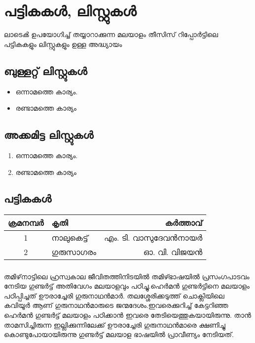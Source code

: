  
\chapter{പട്ടികകൾ, ലിസ്റ്റുകൾ}
ലാടെൿ ഉപയോഗിച്ച് തയ്യാറാക്കുന്ന മലയാളം തീസിസ് റിപ്പോർട്ടിലെ പട്ടികകളും ലിസ്റ്റുകളും ഉള്ള അദ്ധ്യായം

\section{ബുള്ളറ്റ് ലിസ്റ്റുകൾ}

\begin{itemize}
\item ഒന്നാമത്തെ കാര്യം.
\item രണ്ടാമത്തെ കാര്യം
\end{itemize}

\section{അക്കമിട്ട ലിസ്റ്റുകൾ}
\begin{enumerate}
\item ഒന്നാമത്തെ കാര്യം.
\item രണ്ടാമത്തെ കാര്യം
\end{enumerate}


\section{പട്ടികകൾ}

\begin{tabular}{|c|l|r|}
		\hline
		ക്രമനമ്പർ &  കൃതി  & കർത്താവ്  \\ \hline 
		1 & നാലുകെട്ട് & എം. ടി. വാസുദേവൻനായർ \\  \hline
		2 & ഗുരുസാഗരം & ഓ. വി. വിജയൻ \\ \hline
\end{tabular}

\paragraph{}
തമിഴ്‌നാട്ടിലെ ഹ്രസ്വകാല ജീവിതത്തിനിടയിൽ തമിഴ്ഭാഷയിൽ പ്രസംഗപാടവം നേടിയ ഗുണ്ടർട്ട് അതിവേഗം മലയാളവും പഠിച്ചു.ഹെർമൻ ഗുണ്ടർട്ടിനെ മലയാളം പഠിപ്പിച്ചത് ഊരാച്ചേരി ഗുരുനാഥൻമാർ. തലശ്ശേരിക്കടുത്ത് ചൊക്ലിയിലെ കവിയൂർ ആണ് ഗുരുനാഥൻമാരുടെ ജന്മദേശം.ഇവരെക്കുറിച്ച് കേട്ടറിഞ്ഞ ഹെർമൻ ഗുണ്ടർട്ട് മലയാളം പഠിക്കാൻ ഇവരെ തേടിയെത്തുകയായിരുന്നു. താൻ താമസിച്ചിരുന്ന ഇല്ലിക്കുന്നിലേക്ക് ഊരാച്ചേരി ഗുരുനാഥൻമാരെ ക്ഷണിച്ചു കൊണ്ടുപോയായിരുന്നു ഗുണ്ടർട്ട് മലയാള ഭാഷയിൽ പ്രാവീണ്യം നേടിയത്. 

